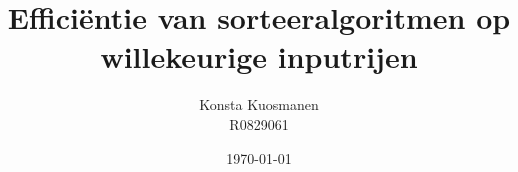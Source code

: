 \documentclass[11pt,a4paper]{article}
\title{Efficiëntie van sorteeralgoritmen op willekeurige inputrijen}
\author{Konsta Kuosmanen \\
        R0829061}
\date{\today}
\begin{document}
\maketitle

\pagebreak

\tableofcontents

\pagebreak











\end{document}
